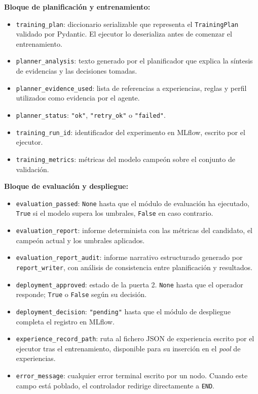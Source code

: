 \textbf{Bloque de planificación y entrenamiento:}
\begin{itemize}
  \item \texttt{training\_plan}: diccionario serializable que representa el \texttt{TrainingPlan} validado por Pydantic. El ejecutor lo deserializa antes de comenzar el entrenamiento.
  \item \texttt{planner\_analysis}: texto generado por el planificador que explica la síntesis de evidencias y las decisiones tomadas.
  \item \texttt{planner\_evidence\_used}: lista de referencias a experiencias, reglas y perfil utilizados como evidencia por el agente.
  \item \texttt{planner\_status}: \texttt{"ok"}, \texttt{"retry\_ok"} o \texttt{"failed"}.
  \item \texttt{training\_run\_id}: identificador del experimento en MLflow, escrito por el ejecutor.
  \item \texttt{training\_metrics}: métricas del modelo campeón sobre el conjunto de validación.
\end{itemize}

\textbf{Bloque de evaluación y despliegue:}
\begin{itemize}
  \item \texttt{evaluation\_passed}: \texttt{None} hasta que el módulo de evaluación ha ejecutado, \texttt{True} si el modelo supera los umbrales, \texttt{False} en caso contrario.
  \item \texttt{evaluation\_report}: informe determinista con las métricas del candidato, el campeón actual y los umbrales aplicados.
  \item \texttt{evaluation\_report\_audit}: informe narrativo estructurado generado por \texttt{report\_writer}, con análisis de consistencia entre planificación y resultados.
  \item \texttt{deployment\_approved}: estado de la puerta 2. \texttt{None} hasta que el operador responde; \texttt{True} o \texttt{False} según su decisión.
  \item \texttt{deployment\_decision}: \texttt{"pending"} hasta que el módulo de despliegue completa el registro en MLflow.
  \item \texttt{experience\_record\_path}: ruta al fichero JSON de experiencia escrito por el ejecutor tras el entrenamiento, disponible para su inserción en el \emph{pool} de experiencias.
  \item \texttt{error\_message}: cualquier error terminal escrito por un nodo. Cuando este campo está poblado, el controlador redirige directamente a \texttt{END}.
\end{itemize}

